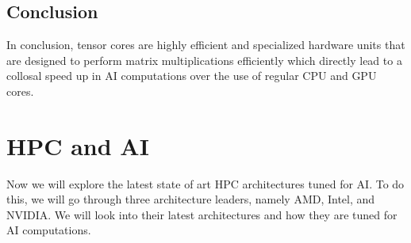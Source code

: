 \documentclass[12pt]{article}
\begin{document}
\subsection{Conclusion}
In conclusion, tensor cores are highly efficient and specialized hardware units that are designed to perform matrix multiplications efficiently which directly lead to a collosal speed up in AI computations over the use of regular CPU and GPU cores.

\section{HPC and AI}
Now we will explore the latest state of art HPC architectures tuned for AI. To do this, we will go through three architecture leaders, namely AMD, Intel, and NVIDIA. We will look into their latest architectures and how they are tuned for AI computations.
\end{document}
